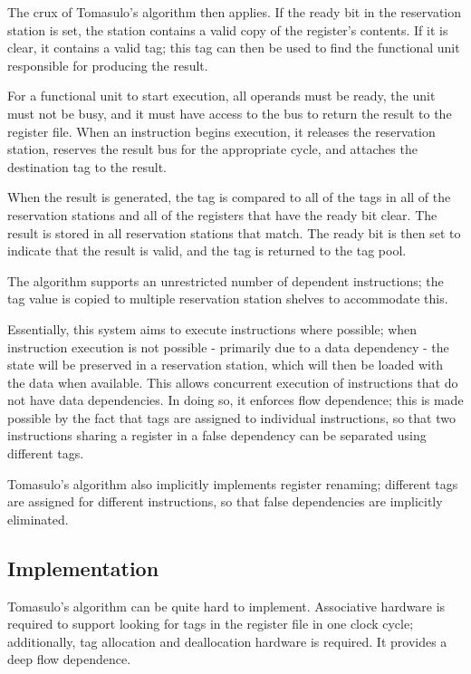 The crux of Tomasulo's algorithm then applies. If the ready bit in the reservation station is set, the station contains a valid copy of the register's contents. If it is clear, it contains a valid tag; this tag can then be used to find the functional unit responsible for producing the result.

For a functional unit to start execution, all operands must be ready, the unit must not be busy, and it must have access to the bus to return the result to the register file. When an instruction begins execution, it releases the reservation station, reserves the result bus for the appropriate cycle, and attaches the destination tag to the result.

When the result is generated, the tag is compared to all of the tags in all of the reservation stations and all of the registers that have the ready bit clear. The result is stored in all reservation stations that match. The ready bit is then set to indicate that the result is valid, and the tag is returned to the tag pool.

The algorithm supports an unrestricted number of dependent instructions; the tag value is copied to multiple reservation station shelves to accommodate this.

Essentially, this system aims to execute instructions where possible; when instruction execution is not possible - primarily due to a data dependency - the state will be preserved in a reservation station, which will then be loaded with the data when available. This allows concurrent execution of instructions that do not have data dependencies. In doing so, it enforces flow dependence; this is made possible by the fact that tags are assigned to individual instructions, so that two instructions sharing a register in a false dependency can be separated using different tags.

Tomasulo's algorithm also implicitly implements register renaming; different tags are assigned for different instructions, so that false dependencies are implicitly eliminated.

\subsection{Implementation}
Tomasulo's algorithm can be quite hard to implement. Associative hardware is required to support looking for tags in the register file in one clock cycle; additionally, tag allocation and deallocation hardware is required. It provides a deep flow dependence.

